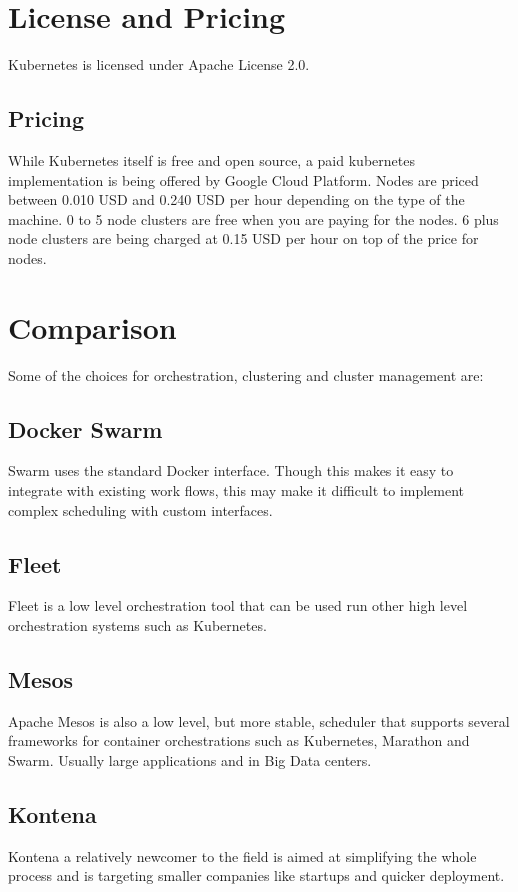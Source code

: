 \documentclass[9pt,twocolumn,twoside]{styles/osajnl}
\begin{document}
\section{License and Pricing}
Kubernetes is licensed under Apache License 2.0.\cite{www-kuberneteslic}

\subsection{Pricing}
While Kubernetes itself is free and open source, a paid kubernetes implementation is being offered by Google Cloud Platform.
Nodes are priced between 0.010 USD and 0.240 USD per hour depending on the type of the machine.\cite{www-googlecontengpricing}
0 to 5 node clusters are free when you are paying for the nodes.
6 plus node clusters are being charged at 0.15  USD per hour on top of the price for nodes.\cite{www-googlecloudpricing}
\section{Comparison}
Some of the choices for orchestration, clustering and cluster management are\cite{www-kubernetesarticle}:
\subsection{Docker Swarm}
 Swarm uses the standard  Docker interface. Though this makes it easy to integrate with existing work flows, this may make it difficult to implement complex scheduling with custom interfaces.
\subsection{Fleet}
Fleet is a low level orchestration tool that can be used run other high level orchestration systems such as Kubernetes.
\subsection{Mesos}
Apache Mesos is also a low level, but more stable, scheduler that supports several frameworks for container orchestrations such as Kubernetes, Marathon and Swarm. Usually large applications and in Big Data centers.
\subsection{Kontena}
Kontena a relatively newcomer to the field is aimed at simplifying the whole process and is targeting smaller companies like startups and quicker deployment\cite{www-kontenasite}.
\end{document}
